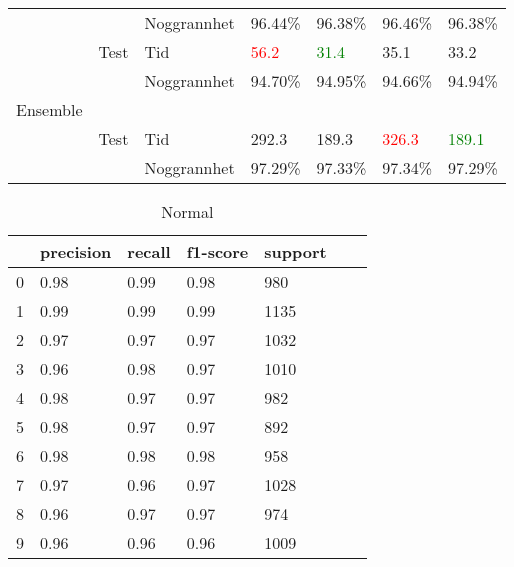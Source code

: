 \documentclass[12pt,a4paper]{article}
\begin{document}
\begin{table}[t]
\begin{tabular}{lll | llll}
			&		& Noggrannhet	& 96.44\%				& 96.38\%				& 96.46\%				& 96.38\%				\\
			& Test	& Tid			& \textcolor{red}{56.2}	& \textcolor{green}{31.4}	& 35.1				& 33.2				\\
			&		& Noggrannhet	& 94.70\%				& 94.95\%				& 94.66\%				& 94.94\%				\\
	Ensemble	&		& 			&					&					&					&					\\
			& Test	& Tid			& 292.3				& 189.3				& \textcolor{red}{326.3}	& \textcolor{green}{189.1}	\\
			&		& Noggrannhet	& 97.29\%				& 97.33\%				& 97.34\%				& 97.29\%				\\
	\end{tabular}
\end{table}



\begin{table}[t]
	\centering
	\footnotesize
	\caption{Normal}
	\begin{tabular}{lllllll}
      \hline 
      &     precision &   recall &  f1-score &  support \\
      \hline 
           0   &    0.98  &    0.99 &     0.98    &   980 \\
           1    &   0.99  &    0.99  &    0.99     & 1135 \\
           2    &   0.97  &    0.97  &    0.97     & 1032 \\
           3    &   0.96  &    0.98    &  0.97   &   1010 \\
           4  &     0.98   &   0.97  &    0.97   &    982 \\
           5   &    0.98   &   0.97  &    0.97   &    892 \\
           6   &    0.98 &     0.98   &   0.98   &    958 \\
           7   &    0.97  &    0.96  &    0.97   &   1028 \\
           8   &    0.96   &   0.97  &    0.97   &    974 \\
           9   &   0.96   &   0.96   &   0.96   &   1009 \\
           	\end{tabular}
\end{table}
\end{document}
